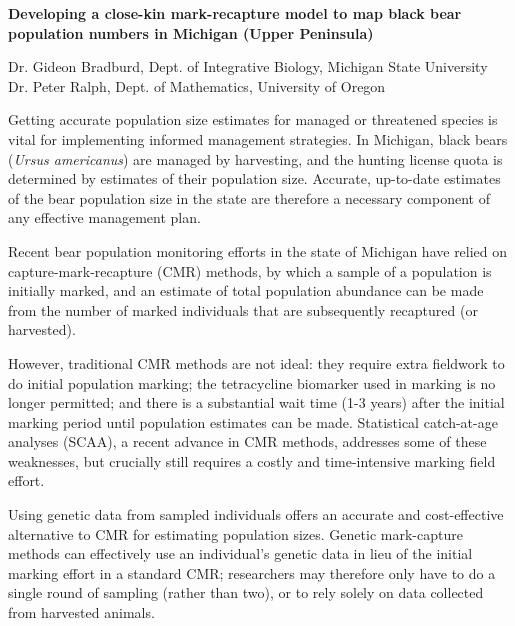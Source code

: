 \documentclass[11pt]{article}
\begin{document}
%
\begin{center}
\textbf{Developing a close-kin mark-recapture model to map black bear population numbers in Michigan (Upper Peninsula)}
\end{center}
%            
\vspace{0.5em}

\noindent Dr. Gideon Bradburd, Dept. of Integrative Biology, Michigan State University\\
\noindent Dr. Peter Ralph, Dept. of Mathematics, University of Oregon

\vspace{1em}

\noindent Getting accurate population size estimates 
for managed or threatened species  
is vital for implementing informed management strategies.
In Michigan, black bears (\textit{Ursus americanus}) 
are managed by harvesting, 
and the hunting license quota is determined by 
estimates of their population size.
Accurate, up-to-date estimates of 
the bear population size in the state 
are therefore a necessary component 
of any effective management plan.

Recent bear population monitoring efforts 
in the state of Michigan have relied on 
capture-mark-recapture (CMR) methods, 
by which a sample of a population is initially marked, 
and an estimate of total population abundance 
can be made from the number of marked individuals 
that are subsequently recaptured (or harvested). 

However, traditional CMR methods are not ideal:  
they require extra fieldwork to do initial population marking; 
the tetracycline biomarker used in marking is no longer permitted; 
and there is a substantial wait time (1-3 years) after the 
initial marking period until population estimates can be made.
Statistical catch-at-age analyses (SCAA), 
a recent advance in CMR methods, 
addresses some of these weaknesses, 
but crucially still requires a costly and time-intensive 
marking field effort.

Using genetic data from sampled individuals 
offers an accurate and cost-effective alternative to CMR 
for estimating population sizes. 
Genetic mark-capture methods can effectively use 
an individual's genetic data in lieu of 
the initial marking effort in a standard CMR; 
researchers may therefore 
only have to do a single round of sampling 
(rather than two), 
or to rely solely on data collected from harvested animals.
\end{document}
